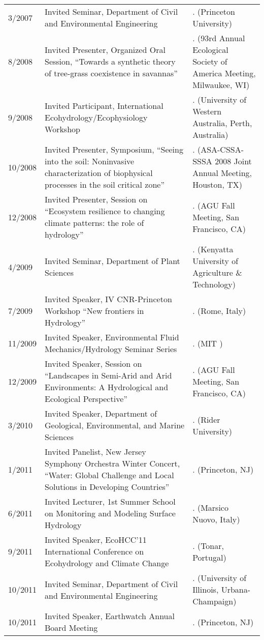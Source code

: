 \begin{longtable}{lp{7.0cm}p{6.5cm}}
3/2007 & Invited Seminar, Department of Civil and Environmental Engineering & . (Princeton University) \\
8/2008 & Invited Presenter, Organized Oral Session, ``Towards a synthetic theory of tree-grass coexistence in savannas'' & . (93rd Annual Ecological Society of America Meeting, Milwaukee, WI) \\
9/2008 & Invited Participant, International Ecohydrology/Ecophysiology Workshop & . (University of Western Australia, Perth, Australia) \\
10/2008 & Invited Presenter, Symposium, ``Seeing into the soil: Noninvasive characterization of biophysical processes in the soil critical zone'' & . (ASA-CSSA-SSSA 2008 Joint Annual Meeting, Houston, TX) \\
12/2008 & Invited Presenter, Session on ``Ecosystem resilience to changing climate patterns: the role of hydrology'' & . (AGU Fall Meeting, San Francisco, CA) \\
4/2009 & Invited Seminar, Department of Plant Sciences & . (Kenyatta University of Agriculture \& Technology) \\
7/2009 & Invited Speaker, IV CNR-Princeton Workshop ``New frontiers in Hydrology'' & . (Rome, Italy) \\
11/2009 & Invited Speaker, Environmental Fluid Mechanics/Hydrology Seminar Series & . (MIT ) \\
12/2009 & Invited Speaker, Session on ``Landscapes in Semi-Arid and Arid Environments: A Hydrological and Ecological Perspective'' & . (AGU Fall Meeting, San Francisco, CA) \\
3/2010 & Invited Speaker, Department of Geological, Environmental, and Marine Sciences & . (Rider University) \\
1/2011 & Invited Panelist, New Jersey Symphony Orchestra Winter Concert, ``Water: Global Challenge and Local Solutions in Developing Countries'' & . (Princeton, NJ) \\
6/2011 & Invited Lecturer, 1st Summer School on Monitoring and Modeling Surface Hydrology & . (Marsico Nuovo, Italy) \\
9/2011 & Invited Speaker, EcoHCC'11 International Conference on Ecohydrology and Climate Change & . (Tonar, Portugal) \\
10/2011 & Invited Seminar, Department of Civil and Environmental Engineering & . (University of Illinois, Urbana-Champaign) \\
10/2011 & Invited Speaker, Earthwatch Annual Board Meeting & . (Princeton, NJ) \\

\end{longtable}
